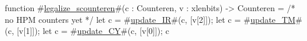 function #\hyperref[sailRISCVzlegalizzezyscounteren]{legalize\_scounteren}#(c : Counteren, v : xlenbits) -> Counteren = {
  /* no HPM counters yet */
  let c = #\hyperref[sailRISCVzupdatezyIR]{update\_IR}#(c, [v[2]]);
  let c = #\hyperref[sailRISCVzupdatezyTM]{update\_TM}#(c, [v[1]]);
  let c = #\hyperref[sailRISCVzupdatezyCY]{update\_CY}#(c, [v[0]]);
  c
}
